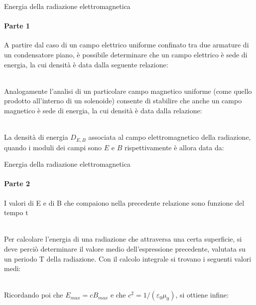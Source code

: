 \documentclass[aspectratio=169]{beamer}
\newcommand*{\vet}{\fontfamily{qzc}\selectfont}
\begin{document}
\begin{frame}{Energia della radiazione elettromagnetica}
	\framesubtitle{Parte 1}
	A partire dal caso di un campo elettrico uniforme confinato tra due armature di un condensatore piano, è possibile determinare che un campo elettrico è sede di energia, la cui densità è data dalla seguente relazione:\\
	\smallskip
	\\
	\smallskip
	\raggedright{Analogamente l'analisi di un particolare campo magnetico uniforme (come quello prodotto all'interno di un solenoide) consente di stabilire che anche un campo magnetico è sede di energia, la cui densità è data dalla relazione:}\\
	\smallskip
	\\
	\smallskip
	\raggedright{La densità di energia $D_{E,B}$ associata al campo elettromagnetico della radiazione, quando i moduli dei campi sono $E$ e $B$ rispettivamente è allora data da:}\\
	\smallskip
\end{frame}

\begin{frame}{Energia della radiazione elettromagnetica}
	\framesubtitle{Parte 2}
	I valori di {\vet E} e di {\vet B} che compaiono nella precedente relazione sono funzione del tempo {\vet t}\\
	\medskip
	\\ 
	\medskip
	\raggedright{Per calcolare l'energia di una radiazione che attraversa una certa superficie, si deve perciò determinare il valore medio dell'espressione precedente, valutata su un periodo {\vet T} della radiazione. Con il calcolo integrale si trovano i seguenti valori medi:}\\
	\medskip
	\\
	\medskip
	\raggedright{Ricordando poi che $E_{max} = c B_{max}$ e che $c^2 = 1/(\varepsilon_{0} \mu_{0})$, si ottiene infine:}\\
	\medskip
\end{frame}
\end{document}
